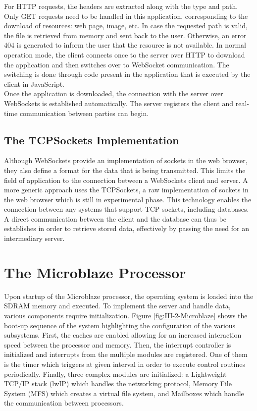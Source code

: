       For HTTP requests, the headers are extracted along with the type and path. Only GET requests need to be handled in this application, corresponding to the download of resources: web page, image, etc. In case the requested path is valid, the file is retrieved from memory and sent back to the user. Otherwise, an error 404 is generated to inform the user that the resource is not available. In normal operation mode, the client connects once to the server over HTTP to download the application and then switches over to WebSocket communication. The switching is done through code present in the application that is executed by the client in JavaScript. \\

      Once the application is downloaded, the connection with the server over WebSockets is established automatically. The server registers the client and real-time communication between parties can begin.

    \subsection{The TCPSockets Implementation}

      Although WebSockets provide an implementation of sockets in the web browser, they also define a format for the data that is being transmitted. This limits the field of application to the connection between a WebSockets client and server. A more generic approach uses the TCPSockets, a raw implementation of sockets in the web browser which is still in experimental phase. This technology enables the connection between any systems that support TCP sockets, including databases. A direct communication between the client and the database can thus be establishes in order to retrieve stored data, effectively by passing the need for an intermediary server.

  \section{The Microblaze Processor}

    Upon startup of the Microblaze processor, the operating system is loaded into the SDRAM memory and executed. To implement the server and handle data, various components require initialization. Figure \ref{fig:III-2-Microblaze} shows the boot-up sequence of the system highlighting the configuration of the various subsystems. First, the caches are enabled allowing for an increased interaction speed between the processor and memory. Then, the interrupt controller is initialized and interrupts from the multiple modules are registered. One of them is the timer which triggers at given interval in order to execute control routines periodically. Finally, three complex modules are initialized: a Lightweight TCP/IP stack (lwIP) which handles the networking protocol, Memory File System (MFS) which creates a virtual file system, and Mailboxes which handle the communication between processors.

